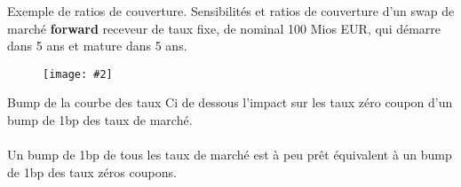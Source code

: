 \documentclass{beamer}
\newcommand{\FIG}[2]{\texttt{[image: \#2]}}
\begin{document}
\begin{frame}{Exemple de ratios de couverture.}
Sensibilités et ratios de couverture d'un swap de marché \textbf{forward} receveur de taux fixe, de nominal 100 Mios EUR, qui démarre dans 5 ans et mature dans 5 ans.
\begin{figure}[h]
\FIG{10cm}{figures/hedgeratio3.png}
\end{figure}
\end{frame}

\begin{frame}{Bump de la courbe des taux}
Ci de dessous l'impact sur les taux zéro coupon d'un bump de 1bp des taux de marché.\\
\vspace{0.5cm}
\tiny
{}\\
\normalsize
\vspace{0.5cm}
Un bump de 1bp de tous les taux de marché est à peu prêt équivalent à un bump de 1bp des taux zéros coupons.
\end{frame}
\end{document}
